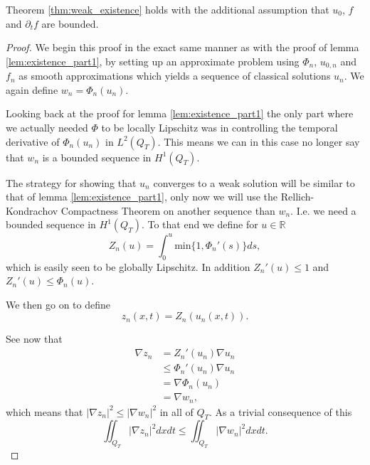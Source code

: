 \documentclass[11pt, a4paper]{article}
\begin{document}
\begin{lemma}
\label{lem:weak_existence_part2}
Theorem \ref{thm:weak_existence} holds with the additional assumption that $u_0$, $f$ and $\partial_t f$ are bounded.
\end{lemma}

\begin{proof}
We begin this proof in the exact same manner as with the proof of lemma \ref{lem:existence_part1}, by setting up an approximate problem using $\Phi_n$, $u_{0,n}$ and $f_n$ as smooth approximations which yields a sequence of classical solutions $u_n$. We again define $w_n = \Phi_n(u_n)$.

Looking back at the proof for lemma \ref{lem:existence_part1} the only part where we actually needed $\Phi$ to be locally Lipschitz was in controlling the temporal derivative of $\Phi_n(u_n)$ in $L^2(Q_T)$. This means we can in this case no longer say that $w_n$ is a bounded sequence in $H^1(Q_T)$.

The strategy for showing that $u_n$ converges to a weak solution will be similar to that of lemma \ref{lem:existence_part1}, only now we will use the Rellich-Kondrachov Compactness Theorem on another sequence than $w_n$. I.e. we need a bounded sequence in $H^1(Q_T)$. To that end we define for $u \in \mathbb{R}$
\begin{equation}
Z_n(u) = \int_0^u \mathrm{min}\{1, \Phi_n'(s)\} ds,
\end{equation}
which is easily seen to be globally Lipschitz. In addition $Z_n'(u) \leq 1$ and $Z_n'(u) \leq \Phi_n(u)$.

We then go on to define
\begin{equation}
z_n(x,t) = Z_n(u_n(x,t)).
\end{equation}

See now that
\begin{align*}
\nabla z_n &= Z_n'(u_n)\nabla u_n \\
	&\leq \Phi_n'(u_n)\nabla u_n \\
	&= \nabla \Phi_n(u_n) \\
	&= \nabla w_n,
\end{align*}
which means that $|\nabla z_n|^2 \leq |\nabla w_n|^2$ in all of $Q_T$. As a trivial consequence of this
\begin{equation*}
\iint_{Q_T}|\nabla z_n|^2dxdt \leq \iint_{Q_T}|\nabla w_n|^2dxdt.
\end{equation*}


\end{proof}
\end{document}
